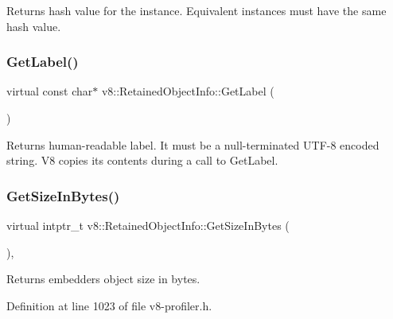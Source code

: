 Returns hash value for the instance. Equivalent instances must have the same hash value. \mbox{\label{classv8_1_1RetainedObjectInfo_ad19106fc7f0499fd45005077551d54c0}} 
\subsubsection{\texorpdfstring{Get\+Label()}{GetLabel()}}
{\footnotesize\ttfamily virtual const char$\ast$ v8\+::\+Retained\+Object\+Info\+::\+Get\+Label (\begin{DoxyParamCaption}{ }\end{DoxyParamCaption})\hspace{0.3cm}{\ttfamily [pure virtual]}}

Returns human-\/readable label. It must be a null-\/terminated U\+T\+F-\/8 encoded string. V8 copies its contents during a call to Get\+Label. \mbox{\label{classv8_1_1RetainedObjectInfo_a1a899eed0b1f6e046edc3c7a7c08aa8c}} 
\subsubsection{\texorpdfstring{Get\+Size\+In\+Bytes()}{GetSizeInBytes()}}
{\footnotesize\ttfamily virtual intptr\+\_\+t v8\+::\+Retained\+Object\+Info\+::\+Get\+Size\+In\+Bytes (\begin{DoxyParamCaption}{ }\end{DoxyParamCaption})\hspace{0.3cm}{\ttfamily [inline]}, {\ttfamily [virtual]}}

Returns embedder\textquotesingle{}s object size in bytes. 

Definition at line 1023 of file v8-\/profiler.\+h.

\mbox{\label{classv8_1_1RetainedObjectInfo_a286103bb076c85415919c86b1838c990}} 
